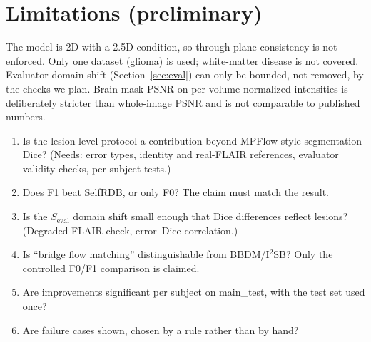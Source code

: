 \documentclass[journal]{IEEEtran}
\newcommand{\Seval}{S_{\mathrm{eval}}}
\begin{document}
\section{Limitations (preliminary)}
The model is 2D with a 2.5D condition, so through-plane consistency is not enforced. Only one dataset (glioma) is used; white-matter
disease is not covered. Evaluator domain shift (Section~\ref{sec:eval}) can only be bounded, not removed, by the checks we plan. Brain-mask PSNR on per-volume normalized intensities is deliberately stricter than
whole-image PSNR and is not comparable to published numbers.

\begin{enumerate}
\item Is the lesion-level protocol a contribution beyond MPFlow-style segmentation Dice? (Needs: error types, identity and real-FLAIR references, evaluator
validity checks, per-subject tests.)
\item Does F1 beat SelfRDB, or only F0? The claim must match the result.
\item Is the $\Seval$ domain shift small enough that Dice differences reflect lesions? (Degraded-FLAIR check, error--Dice correlation.)
\item Is ``bridge flow matching'' distinguishable from BBDM/I$^2$SB? Only the controlled F0/F1 comparison is claimed.
\item Are improvements significant per subject on main\_test, with the test set used once?
\item Are failure cases shown, chosen by a rule rather than by hand?
\end{enumerate}



\end{document}
